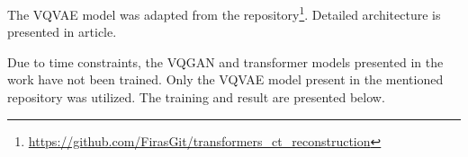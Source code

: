 The VQVAE model was adapted from the repository\footnote{\url{https://github.com/FirasGit/transformers_ct_reconstruction}}. Detailed architecture is presented in article\cite{khader_transformers_2023}.

Due to time constraints, the VQGAN and transformer models presented in the work have not been trained. Only the VQVAE model present in the mentioned repository was utilized. The training and result are presented below. 

